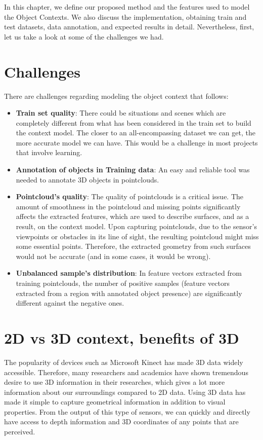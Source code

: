 In this chapter, we define our proposed method and the features used to model the Object Contexts. We also discuss the implementation, obtaining train and test datasets, data annotation, and expected results in detail. Nevertheless, first, let us take a look at some of the challenges we had.

\section{Challenges}
\label{Challenges.sec}

There are challenges regarding modeling the object context that follows:

\begin{itemize}

 \item {\bf Train set quality}: There could be situations and scenes which are completely different from what has been considered in the train set to build the context model. The closer to an all-encompassing dataset we can get, the more accurate model we can have. This would be a challenge in most projects that involve learning.
	
 \item {\bf Annotation of objects in Training data}: An easy and reliable tool was needed to annotate 3D objects in pointclouds.
	
 \item {\bf Pointcloud's quality}: The quality of pointclouds is a critical issue. The amount of smoothness in the pointcloud and missing points significantly affects the extracted features, which are used to describe surfaces, and as a result, on the context model. 
 Upon capturing pointclouds, due to the sensor's viewpoints or obstacles in its line of sight, the resulting pointcloud might miss some essential points. Therefore, the extracted geometry from such surfaces would not be accurate (and in some cases, it would be wrong).
 
 \item {\bf Unbalanced sample's distribution}: In feature vectors extracted from training pointclouds, the number of positive samples (feature vectors extracted from a region with annotated object presence) are significantly different against the negative ones.
 
\end{itemize}


\section{2D vs 3D context, benefits of 3D}
The popularity of devices such as Microsoft Kinect has made 3D data widely accessible. 
Therefore, many researchers and academics have shown tremendous desire to use 3D information in their researches, 
which gives a lot more information about our surroundings compared to 2D data. 
Using 3D data has made it simple to capture geometrical information in addition to visual properties. 
From the output of this type of sensors, we can quickly and directly have access to depth information and 3D 
coordinates of any points that are perceived.

